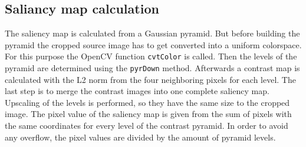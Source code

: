 \documentclass[draft,final]{vutinfth} %
\begin{document}
	\subsection{Saliancy map calculation}
	The saliency map is calculated from a Gaussian pyramid.
	But before building the pyramid the cropped source image has to get converted into a uniform colorspace.
	For this purpose the OpenCV function \texttt{cvtColor} is called.
	Then the levels of the pyramid are determined using the \texttt{pyrDown} method.
	Afterwards a contrast map is calculated with the L2 norm from the four neighboring pixels for each level.
	The last step is to merge the contrast images into one complete saliency map.
	Upscaling of the levels is performed, so they have the same size to the cropped image.
	The pixel value of the saliency map is given from the sum of pixels with the same coordinates for every level of the contrast pyramid. 
	In order to avoid any overflow, the pixel values are divided by the amount of pyramid levels.
	
\end{document}
